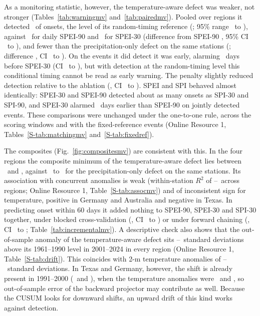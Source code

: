 \documentclass[pdflatex,sn-mathphys-ay]{sn-jnl}
\theoremstyle{thmstyletwo}
\begin{document}
As a monitoring statistic, however, the temperature-aware defect was weaker, not stronger
(Tables~\ref{tab:warningmv} and~\ref{tab:pairedmv}). Pooled over regions it detected \mvpodallDeight\ of
onsets, the level of its random-timing reference (\mvchanceallDeight; 95\% range \mvchanceloallDeight\ to
\mvchancehiallDeight), against \mvpodallDoneone\ for daily SPEI-90 and \mvpodallDonezero\ for SPEI-30 (difference from
SPEI-90 \dpodallmvDeightDoneone, 95\% CI \dpodloallmvDeightDoneone\ to \dpodhiallmvDeightDoneone), and
fewer than the precipitation-only defect on the same stations (\mvpodallDone; difference
\dpodallmvDeightDone, CI \dpodloallmvDeightDone\ to \dpodhiallmvDeightDone). On the events it did detect
it was early, alarming \dtimallmvDeightDonezero\ days before SPEI-30 (CI \dtimloallmvDeightDonezero\ to
\dtimhiallmvDeightDonezero), but with detection at the random-timing level this conditional timing
cannot be read as early warning. The penalty slightly reduced detection relative to the ablation
(\dpodallmvDeightDnine, CI \dpodloallmvDeightDnine\ to \dpodhiallmvDeightDnine). SPEI and SPI behaved
almost identically: SPEI-30 and SPEI-90 detected about as many onsets as SPI-30 and SPI-90, and SPEI-30
alarmed \dtimallmvDonezeroDoneone\ days earlier than SPEI-90 on jointly detected events. These comparisons
were unchanged under the one-to-one rule, across the scoring windows and with the fixed-reference events
(Online Resource 1, Tables~\ref{S-tab:matchingmv} and~\ref{S-tab:fixedref}).




The composites (Fig.~\ref{fig:compositesmv}) are consistent with this. In the four regions the composite
minimum of the temperature-aware defect lies between \compmvDeightminlo\ and \compmvDeightminhi, against
\compmvDoneminlo\ to \compmvDoneminhi\ for the precipitation-only defect on the same stations. Its association with concurrent
anomalies is weak (within-station $R^2$ of \mvassocrtwotexas--\mvassocrtwogermany\ across regions;
Online Resource 1, Table~\ref{S-tab:assocmv}) and of inconsistent sign for temperature, positive in Germany and
Australia and negative in Texas. In predicting onset within 60 days it added nothing to SPEI-90, SPEI-30
and SPI-30 together, under blocked cross-validation (\mvdaucallbasepDeight, CI \mvdaucallbasepDeightlo\ to
\mvdaucallbasepDeighthi) or under forward chaining (\mvfwddaucallbasepDeight, CI
\mvfwddaucallbasepDeightlo\ to \mvfwddaucallbasepDeighthi; Table~\ref{tab:incrementalmv}). A descriptive check also shows that the out-of-sample anomaly of the
temperature-aware defect sits \driftDeightlo--\driftDeighthi\ standard deviations above its 1961--1990
level in 2001--2024 in every region (Online Resource 1, Table~\ref{S-tab:drift}). This coincides with
2-m temperature anomalies of \drifttlo--\driftthi\ standard deviations. In Texas and Germany, however,
the shift is already present in 1991--2000 (\driftDeightcaltexas\ and \driftDeightcalgermany), when the
temperature anomalies were \drifttcaltexas\ and \drifttcalgermany, so out-of-sample error of the
backward projector may contribute as well. Because the CUSUM looks for downward shifts, an upward drift
of this kind works against detection.
\end{document}
